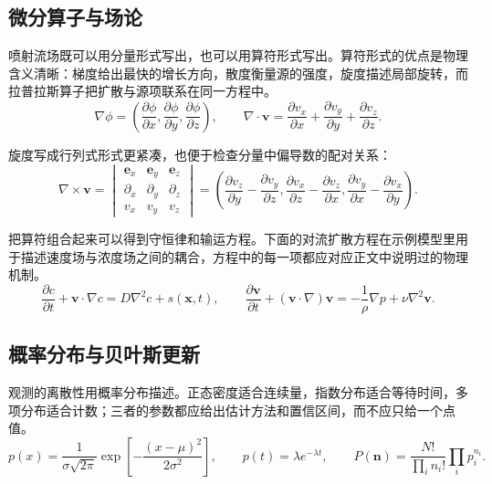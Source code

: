 \subsection{微分算子与场论}

喷射流场既可以用分量形式写出，也可以用算符形式写出。算符形式的优点是物理含义清晰：梯度给出最快的增长方向，散度衡量源的强度，旋度描述局部旋转，而拉普拉斯算子把扩散与源项联系在同一方程中。
\begin{equation}
  \nabla\phi=
  \left(\frac{\partial\phi}{\partial x},
  \frac{\partial\phi}{\partial y},
  \frac{\partial\phi}{\partial z}\right),\qquad
  \nabla\cdot\bm{v}=
  \frac{\partial v_x}{\partial x}
  +\frac{\partial v_y}{\partial y}
  +\frac{\partial v_z}{\partial z}.
  \label{eq:field-operators}
\end{equation}

旋度写成行列式形式更紧凑，也便于检查分量中偏导数的配对关系：
\begin{equation}
  \nabla\times\bm{v}=
  \begin{vmatrix}
    \bm{e}_x&\bm{e}_y&\bm{e}_z\\
    \partial_x&\partial_y&\partial_z\\
    v_x&v_y&v_z
  \end{vmatrix}
  =
  \left(
  \frac{\partial v_z}{\partial y}-\frac{\partial v_y}{\partial z},
  \frac{\partial v_x}{\partial z}-\frac{\partial v_z}{\partial x},
  \frac{\partial v_y}{\partial x}-\frac{\partial v_x}{\partial y}
  \right).
  \label{eq:curl}
\end{equation}

把算符组合起来可以得到守恒律和输运方程。下面的对流扩散方程在示例模型里用于描述速度场与浓度场之间的耦合，方程中的每一项都应对应正文中说明过的物理机制。
\begin{equation}
  \frac{\partial c}{\partial t}+\bm{v}\cdot\nabla c
    =D\nabla^2c+s(\bm{x},t),\qquad
  \frac{\partial\bm{v}}{\partial t}
    +(\bm{v}\cdot\nabla)\bm{v}
    =-\frac{1}{\rho}\nabla p+\nu\nabla^2\bm{v}.
  \label{eq:transport}
\end{equation}

\subsection{概率分布与贝叶斯更新}

观测的离散性用概率分布描述。正态密度适合连续量，指数分布适合等待时间，多项分布适合计数；三者的参数都应给出估计方法和置信区间，而不应只给一个点值。
\begin{equation}
  p(x)=\frac{1}{\sigma\sqrt{2\pi}}
    \exp\!\left[-\frac{(x-\mu)^2}{2\sigma^2}\right],\qquad
  p(t)=\lambda e^{-\lambda t},\qquad
  P(\bm{n})=\frac{N!}{\prod_i n_i!}\prod_i p_i^{n_i}.
  \label{eq:distributions}
\end{equation}

